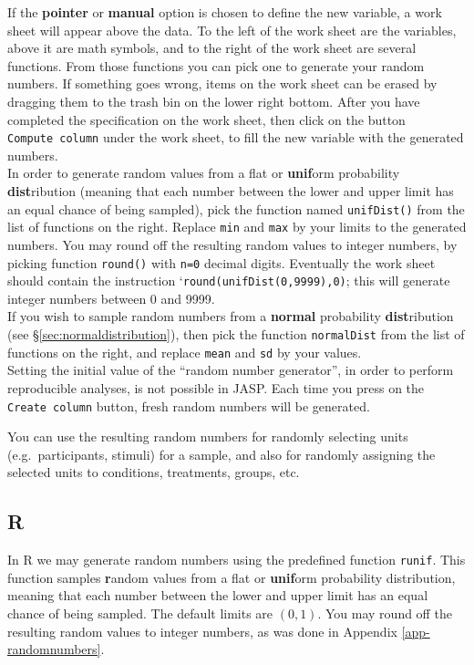 \documentclass[
]{book}
\begin{document}
If the \textbf{pointer} or \textbf{manual} option is chosen to define the new variable, a work sheet will appear above the data. To the left of the work sheet are the variables, above it are math symbols, and to the right of the work sheet are several functions. From those functions you can pick one to generate your random numbers. If something goes wrong, items on the work sheet can be erased by dragging them to the trash bin on the lower right bottom. After you have completed the specification on the work sheet, then click on the button \texttt{Compute\ column} under the work sheet, to fill the new variable with the generated numbers.\\
In order to generate random values from a flat or \textbf{unif}orm probability \textbf{dist}ribution (meaning that each number between the lower and upper limit has an equal chance of being sampled), pick the function named \texttt{unifDist()} from the list of functions on the right. Replace \texttt{min} and \texttt{max} by your limits to the generated numbers. You may round off the resulting random values to integer numbers, by picking function \texttt{round()} with \texttt{n=0} decimal digits. Eventually the work sheet should contain the instruction `\texttt{round(unifDist(0,9999),0)}; this will generate integer numbers between 0 and 9999.\\
If you wish to sample random numbers from a \textbf{normal} probability \textbf{dist}ribution (see §\ref{sec:normaldistribution}), then pick the function \texttt{normalDist} from the list of functions on the right, and replace \texttt{mean} and \texttt{sd} by your values.\\

Setting the initial value of the ``random number generator'', in order to perform reproducible analyses, is not possible in JASP. Each time you press on the \texttt{Create\ column} button, fresh random numbers will be generated.

You can use the resulting random numbers for randomly selecting units (e.g.~participants, stimuli) for a sample, and also for randomly assigning the selected units to conditions, treatments, groups, etc.

\hypertarget{r}{%
\subsection{R}\label{r}}

In R we may generate random numbers using the predefined function \texttt{runif}.
This function samples \textbf{r}andom values from a flat or \textbf{unif}orm probability distribution, meaning that each number between the lower and upper limit has an equal chance of being sampled. The default limits are \((0,1)\). You may round off the resulting random values to integer numbers, as was done in Appendix \ref{app-randomnumbers}.
\end{document}
